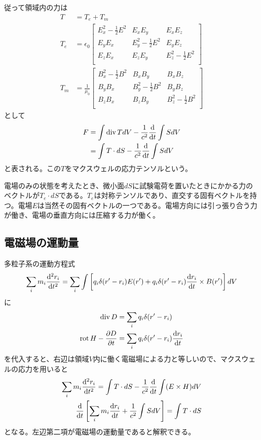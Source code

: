     従って領域内の力は
    \begin{align*}
        T &= T_e + T_m\\
        T_e &= \epsilon_0
        \begin{bmatrix}
            E_x^2 - \frac{1}{2}E^2 & E_xE_y & E_xE_z\\
            E_yE_x & E_y^2 - \frac{1}{2}E^2 & E_yE_z\\
            E_zE_x & E_zE_y & E_z^2 - \frac{1}{2}E^2\\
        \end{bmatrix}\\
        T_m &= \frac{1}{\mu_0}
        \begin{bmatrix}
            B_x^2 - \frac{1}{2}B^2 & B_xB_y & B_xB_z\\
            B_yB_x & B_y^2 - \frac{1}{2}B^2 & B_yB_z\\
            B_zB_x & B_zB_y & B_z^2 - \frac{1}{2}B^2\\
        \end{bmatrix}
    \end{align*}
    として
    \begin{align*}
        F   &= \int \operatorname{div} T dV - \frac{1}{c^2}\dv{t}\int S dV\\
            &= \int T \cdot dS - \frac{1}{c^2}\dv{t}\int S dV
    \end{align*}
    と表される。この$T$をマクスウェルの応力テンソルという。

    電場のみの状態を考えたとき、微小面$dS$に試験電荷を置いたときにかかる力のベクトルが$T_e \cdot dS$である。$T_e$は対称テンソルであり、直交する固有ベクトルを持つ。電場$E$は当然その固有ベクトルの一つである。電場方向には引っ張り合う力が働き、電場の垂直方向には圧縮する力が働く。

\subsection{電磁場の運動量}
    多粒子系の運動方程式
        \[\sum_i m_i\dv[2]{r_i}{t} = \sum_i \int \left[q_i\delta(r' - r_i)E(r') + q_i\delta(r' - r_i)\dv{r_i}{t} \times B(r')\right] dV\]
    に
    \begin{align*}
        \operatorname{div} D &= \sum_i q_i\delta(r' - r_i)\\
        \operatorname{rot} H - \pdv{D}{t} &= \sum_i q_i\delta(r' - r_i)\dv{r_i}{t}\\
    \end{align*}
    を代入すると、右辺は領域$V$内に働く電磁場による力と等しいので、マクスウェルの応力を用いると
    \begin{align*}
        \sum_i m_i\dv[2]{r_i}{t} = \int T \cdot dS - \frac{1}{c^2}\dv{t}\int (E \times H) dV\\
        \dv{t}\left[\sum_i m_i\dv{r_i}{t} + \frac{1}{c^2}\int S dV\right] = \int T \cdot dS
    \end{align*}
    となる。左辺第二項が電磁場の運動量であると解釈できる。

